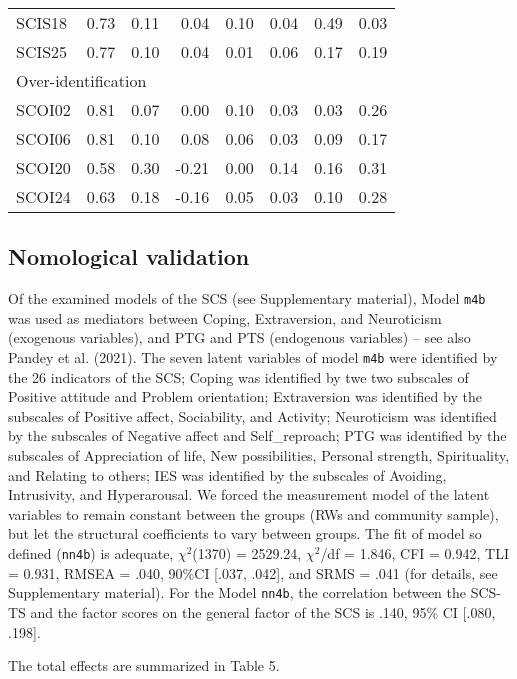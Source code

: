 \documentclass[
  man]{apa7}
\begin{document}
\begin{longtable}{lrrrrrrr}
SCIS18 & 0.73 & 0.11 & 0.04 & 0.10 & 0.04 & 0.49 & 0.03 \\ 
SCIS25 & 0.77 & 0.10 & 0.04 & 0.01 & 0.06 & 0.17 & 0.19 \\ 
\midrule
\multicolumn{8}{l}{Over-identification} \\ 
\midrule
SCOI02 & 0.81 & 0.07 & 0.00 & 0.10 & 0.03 & 0.03 & 0.26 \\ 
SCOI06 & 0.81 & 0.10 & 0.08 & 0.06 & 0.03 & 0.09 & 0.17 \\ 
SCOI20 & 0.58 & 0.30 & -0.21 & 0.00 & 0.14 & 0.16 & 0.31 \\ 
SCOI24 & 0.63 & 0.18 & -0.16 & 0.05 & 0.03 & 0.10 & 0.28 \\ 
\bottomrule
\end{longtable}

\hypertarget{nomological-validation}{%
\subsection{Nomological validation}\label{nomological-validation}}

Of the examined models of the SCS (see Supplementary material), Model \texttt{m4b} was used as mediators between Coping, Extraversion, and Neuroticism (exogenous variables), and PTG and PTS (endogenous variables) -- see also Pandey et al. (2021). The seven latent variables of model \texttt{m4b} were identified by the 26 indicators of the SCS; Coping was identified by twe two subscales of Positive attitude and Problem orientation; Extraversion was identified by the subscales of Positive affect, Sociability, and Activity; Neuroticism was identified by the subscales of Negative affect and Self\_reproach; PTG was identified by the subscales of Appreciation of life, New possibilities, Personal strength, Spirituality, and Relating to others; IES was identified by the subscales of Avoiding, Intrusivity, and Hyperarousal. We forced the measurement model of the latent variables to remain constant between the groups (RWs and community sample), but let the structural coefficients to vary between groups. The fit of model so defined (\texttt{nn4b}) is adequate, \(\chi^2\)(1370) = 2529.24, \(\chi^2\)/df = 1.846, CFI = 0.942, TLI = 0.931, RMSEA = .040, 90\%CI {[}.037, .042{]}, and SRMS = .041 (for details, see Supplementary material). For the Model \texttt{nn4b}, the correlation between the SCS-TS and the factor scores on the general factor of the SCS is .140, 95\% CI {[}.080, .198{]}.

The total effects are summarized in Table 5.
\end{document}
